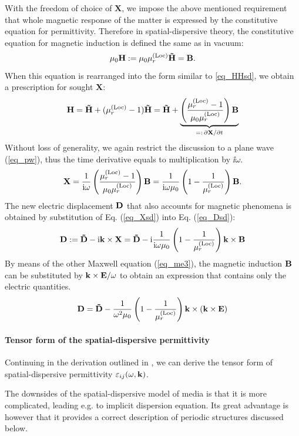 With the freedom of choice of $\mathbf{X}$, we impose the above mentioned requirement that whole magnetic response of the matter is expressed by the constitutive equation for permittivity. Therefore in spatial-dispersive theory, the constitutive equation %
for magnetic induction is defined the same as in vacuum:
\begin{equation} \mu_0 \mathbf{H} := \mu_0 \mu^{\rm(Loc)}_r \mathbf{\tilde{H}} = \mathbf{B}. \label{eq_mu_sd}\end{equation}
When this equation is rearranged into the form similar to \ref{eq_HHsd}, we obtain a prescription for sought $\mathbf{X}$: 
$$ \mathbf{H} = \mathbf{\tilde{H}} + (\mu^{\rm(Loc)}_r -1)\mathbf{\tilde{H}} = \mathbf{\tilde{H}} + \underbrace{\left(\frac{\mu^{\rm(Loc)}_r-1}{\mu_0\mu^{\rm(Loc)}_r}\right)\mathbf{B}}_{=:\,\partial\mathbf{X}/\partial t}$$
Without loss of generality, we again restrict the discussion to a plane wave (\ref{eq_pw}), thus the time derivative equals to multiplication by $\ii\omega$.
\begin{equation} \mathbf{X} = \frac{1}{{\mathrm i}\omega}\left(\frac{\mu^{\rm(Loc)}_r-1}{\mu_0\mu^{\rm(Loc)}_r}\right)\mathbf{B} = \frac{1}{{\mathrm i}\omega\mu_0}\left(1 - \frac{1}{\mu^{\rm(Loc)}_r}\right)\mathbf{B}. \label{eq_Xsd}\end{equation}
The new electric displacement $\mathbf{D}$ that also accounts for magnetic phenomena is obtained by substitution of Eq. (\ref{eq_Xsd}) into Eq. (\ref{eq_Dsd}):
\begin{equation} \mathbf{D} := \mathbf{\tilde{D}} - {\mathrm i}{\mathbf{k}}\times \mathbf{X} =  \mathbf{\tilde{D}} - {\mathrm i}  \frac{1}{{\mathrm i}\omega\mu_0}\left(1 - \frac{1}{\mu^{\rm(Loc)}_r}\right) {\mathbf{k}}\times \mathbf{B}  \label{eq_Dsd2}\end{equation}
By means of the other Maxwell equation (\ref{eq_me3}), the magnetic induction $\mathbf{B}$ can be substituted by ${\mathbf{k}}\times\mathbf{E} / \omega$ to obtain an expression that contains only the electric quantities.
\begin{equation} \mathbf{D} = \mathbf{\tilde{D}} - \frac{1}{\omega^2 \mu_0}\left(1 - \frac{1}{\mu^{\rm(Loc)}_r}\right) {\mathbf{k}}\times({\mathbf{k}}\times \mathbf{E})  \label{eq_Dsd3}\end{equation}
\paragraph{Tensor form of the spatial-dispersive permittivity}%
Continuing in the derivation outlined in \cite{landau1984electrodynamics, krowne2007book, agranovich2006spatial}, we can derive the tensor form of spatial-dispersive permittivity $\varepsilon_{ij}(\omega,{\mathbf{k}})$.

The downsides of the spatial-dispersive model of media is that it is more complicated, leading e.g. to implicit dispersion equation. Its great advantage is however that it provides a correct description of periodic structures discussed below. 
